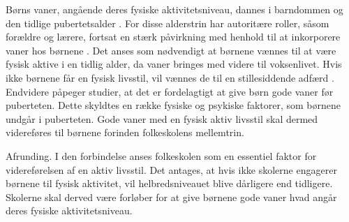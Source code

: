 Børns vaner, angående deres fysiske aktivitetsniveau, dannes i barndommen og den tidlige pubertetsalder \citep{F.SallisG.Simons-MortonJ.Stone1992}. For disse alderstrin har autoritære roller, såsom forældre og lærere, fortsat en stærk påvirkning med henhold til at inkorporere vaner hos børnene \citep{L.MeyerP.Gullotta2012}. \newline
Det anses som nødvendigt at børnene vænnes til at være fysisk aktive i en tidlig alder, da vaner bringes med videre til voksenlivet. Hvis ikke børnene får en fysisk livsstil, vil vænnes de til en stillesiddende adfærd \citep{Nabe-NielsenSundhedsministerietetal.2005,P.J.KremersBrug2008,L.MeyerP.Gullotta2012}. Endvidere påpeger studier, at det er fordelagtigt at give børn gode vaner før puberteten. Dette skyldtes en række fysiske og psykiske faktorer, som børnene undgår i puberteten. Gode vaner med en fysisk aktiv livsstil skal dermed videreføres til børnene forinden folkeskolens mellemtrin. 




Afrunding. 
I den forbindelse anses folkeskolen som en essentiel faktor for videreførelsen af en aktiv livsstil. Det antages, at hvis ikke skolerne engagerer børnene til fysisk aktivitet, vil helbredsniveauet blive dårligere end tidligere. Skolerne skal derved være forløber for at give børnene gode vaner hvad angår deres fysiske aktivitetsniveau. \citep{L.MeyerP.Gullotta2012}


